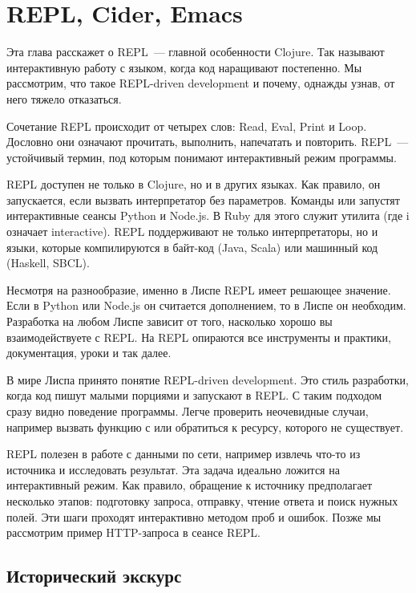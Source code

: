 \chapter{REPL, Cider, Emacs}

\begin{teaser}
Эта глава расскажет о REPL~--- главной особенности Clojure. Так называют интерактивную работу с языком, когда код наращивают постепенно. Мы рассмотрим, что такое REPL-driven development и почему, однажды узнав, от него тяжело отказаться.
\end{teaser}

Сочетание REPL происходит от четырех слов: Read, Eval, Print и Loop. Дословно они означают прочитать, выполнить, напечатать и повторить. REPL~--- устойчивый термин, под которым понимают интерактивный режим программы.

REPL доступен не только в Clojure, но и в других языках. Как правило, он запускается, если вызвать интерпретатор без параметров. Команды  или  запустят интерактивные сеансы Python и Node.js. В Ruby для этого служит утилита  (где i означает interactive). REPL поддерживают не только интерпретаторы, но и языки, которые компилируются в байт-код (Java, Scala) или машинный код (Haskell, SBCL).

Несмотря на разнообразие, именно в Лиспе REPL имеет решающее значение. Если в Python или Node.js он считается дополнением, то в Лиспе он необходим. Разработка на любом Лиспе зависит от того, насколько хорошо вы взаимодействуете с REPL. На REPL опираются все инструменты и практики, документация, уроки и так далее.

В мире Лиспа принято понятие REPL-driven development. Это стиль разработки, когда код пишут малыми порциями и запускают в REPL. С таким подходом сразу видно поведение программы. Легче проверить неочевидные случаи, например вызвать функцию с  или обратиться к ресурсу, которого не существует.

REPL полезен в работе с данными по сети, например извлечь что-то из источника и исследовать результат. Эта задача идеально ложится на интерактивный режим. Как правило, обращение к источнику предполагает несколько этапов: подготовку запроса, отправку, чтение ответа и поиск нужных полей. Эти шаги проходят интерактивно методом проб и ошибок. Позже мы рассмотрим пример HTTP-запроса в сеансе REPL.

\section{Исторический экскурс}

